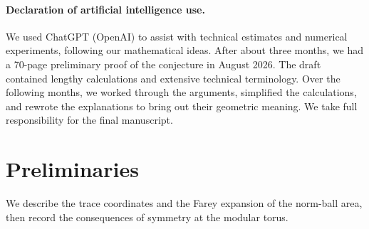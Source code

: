 \documentclass[10pt,twoside]{article}
\theoremstyle{plain}
\theoremstyle{definition}
\theoremstyle{remark}
\begin{document}
\paragraph{Declaration of artificial intelligence use.}
We used ChatGPT (OpenAI) to assist with technical estimates and
numerical experiments, following our mathematical ideas. After
about three months, we had a 70-page preliminary proof of the
conjecture in August 2026. The draft contained lengthy calculations
and extensive technical terminology. Over the following months,
we worked through the arguments, simplified the calculations, and
rewrote the explanations to bring out their geometric meaning.
We take full responsibility for the final manuscript.

\section{Preliminaries}
\label{sec:coordinates}

We describe the trace coordinates and the Farey expansion of the norm-ball
area, then record the consequences of symmetry at the modular torus.
\end{document}
